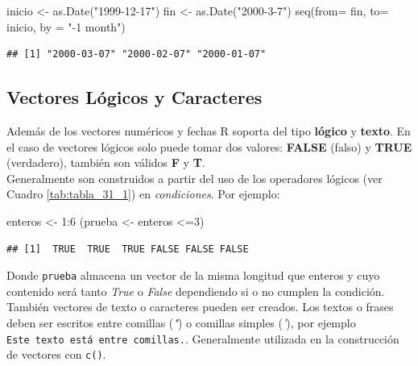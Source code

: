 \documentclass[
]{book}
\newenvironment{Shaded}{\begin{snugshade}}{\end{snugshade}}
\newcommand{\AttributeTok}[1]{\textcolor[rgb]{0.77,0.63,0.00}{#1}}
\newcommand{\DecValTok}[1]{\textcolor[rgb]{0.00,0.00,0.81}{#1}}
\newcommand{\FunctionTok}[1]{\textcolor[rgb]{0.00,0.00,0.00}{#1}}
\newcommand{\NormalTok}[1]{#1}
\newcommand{\OtherTok}[1]{\textcolor[rgb]{0.56,0.35,0.01}{#1}}
\newcommand{\SpecialCharTok}[1]{\textcolor[rgb]{0.00,0.00,0.00}{#1}}
\newcommand{\StringTok}[1]{\textcolor[rgb]{0.31,0.60,0.02}{#1}}
\begin{document}
\begin{Shaded}
\begin{Highlighting}[]
\NormalTok{inicio }\OtherTok{\textless{}{-}} \FunctionTok{as.Date}\NormalTok{(}\StringTok{"1999{-}12{-}17"}\NormalTok{)}
\NormalTok{fin }\OtherTok{\textless{}{-}} \FunctionTok{as.Date}\NormalTok{(}\StringTok{"2000{-}3{-}7"}\NormalTok{)}
\FunctionTok{seq}\NormalTok{(}\AttributeTok{from=}\NormalTok{ fin, }
    \AttributeTok{to=}\NormalTok{ inicio, }
    \AttributeTok{by =} \StringTok{"{-}1 month"}\NormalTok{)}
\end{Highlighting}
\end{Shaded}

\begin{verbatim}
## [1] "2000-03-07" "2000-02-07" "2000-01-07"
\end{verbatim}

\hypertarget{vec-log}{%
\subsection{Vectores Lógicos y Caracteres}\label{vec-log}}

Además de los vectores numéricos y fechas R soporta del tipo \textbf{lógico} y \textbf{texto}. En el caso de vectores lógicos solo puede tomar dos valores: \textbf{FALSE} (falso) y \textbf{TRUE} (verdadero), también son válidos \textbf{F} y \textbf{T}.\\
Generalmente son construidos a partir del uso de los operadores lógicos (ver Cuadro \ref{tab:tabla_31_1}) en \emph{condiciones}. Por ejemplo:

\begin{Shaded}
\begin{Highlighting}[]
\NormalTok{enteros }\OtherTok{\textless{}{-}} \DecValTok{1}\SpecialCharTok{:}\DecValTok{6}
\NormalTok{(prueba }\OtherTok{\textless{}{-}}\NormalTok{ enteros }\SpecialCharTok{\textless{}=}\DecValTok{3}\NormalTok{)}
\end{Highlighting}
\end{Shaded}

\begin{verbatim}
## [1]  TRUE  TRUE  TRUE FALSE FALSE FALSE
\end{verbatim}

Donde \texttt{prueba} almacena un vector de la misma longitud que enteros y cuyo contenido será tanto \emph{True} o \emph{False} dependiendo si o no cumplen la condición.\\
También vectores de texto o caracteres pueden ser creados. Los textos o frases deben ser escritos entre comillas (\emph{"}) o comillas simples (\emph{'}), por ejemplo \texttt{\textquotesingle{}Este\ texto\ está\ entre\ comillas.\textquotesingle{}}. Generalmente utilizada en la construcción de vectores con \texttt{c()}.
\end{document}
